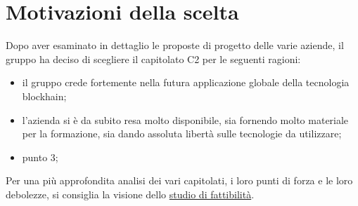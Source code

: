 \section{Motivazioni della scelta}\label{section:motivazioni}

Dopo aver esaminato in dettaglio le proposte di progetto delle varie aziende,
 il gruppo ha deciso di scegliere il capitolato C2 per le seguenti ragioni:
\begin{itemize}
    \item il gruppo crede fortemente nella futura applicazione globale della tecnologia blockhain;
    \item l'azienda si è da subito resa molto disponibile, sia fornendo molto materiale per la formazione, sia dando assoluta libertà sulle tecnologie da utilizzare;
    \item punto 3; 
\end{itemize}

Per una più approfondita analisi dei vari capitolati,
 i loro punti di forza e le loro debolezze, si consiglia la visione dello \href{https://yakuzaishi-swe.github.io/docs/docs/studio_fattibilita.pdf}{studio di fattibilità}.